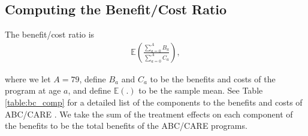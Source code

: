 

\subsection{Computing the Benefit/Cost Ratio}\label{app:method_cbratio}

\noindent The benefit/cost ratio is
\begin{align}
\mathbb{E} \left( \frac{ \sum_{a=0}^A B_a}{\sum_{a=0}^A C_a} \right),
\end{align}

\noindent where we let $A = 79$, define $B_a$ and $C_a$ to be the benefits and costs of the
program at age $a$, and define $\mathbb{E}(.)$ to be the sample mean. See Table \ref{table:bc_comp} for a detailed list of the components
to the benefits and costs of ABC/CARE . We take the sum of the treatment effects on each component
of the benefits to be the total benefits of the ABC/CARE programs. \\

